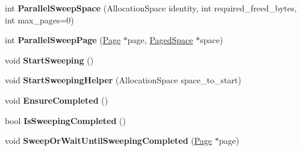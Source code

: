 \begin{DoxyCompactItemize}
\item 
int {\bfseries Parallel\+Sweep\+Space} (Allocation\+Space identity, int required\+\_\+freed\+\_\+bytes, int max\+\_\+pages=0)\hypertarget{classv8_1_1internal_1_1_mark_compact_collector_1_1_sweeper_abfb8bd676f662b93aef637f27d3d20a8}{}\label{classv8_1_1internal_1_1_mark_compact_collector_1_1_sweeper_abfb8bd676f662b93aef637f27d3d20a8}

\item 
int {\bfseries Parallel\+Sweep\+Page} (\hyperlink{classv8_1_1internal_1_1_page}{Page} $\ast$page, \hyperlink{classv8_1_1internal_1_1_paged_space}{Paged\+Space} $\ast$space)\hypertarget{classv8_1_1internal_1_1_mark_compact_collector_1_1_sweeper_a6d1d797e55de73869c883dd8752513b7}{}\label{classv8_1_1internal_1_1_mark_compact_collector_1_1_sweeper_a6d1d797e55de73869c883dd8752513b7}

\item 
void {\bfseries Start\+Sweeping} ()\hypertarget{classv8_1_1internal_1_1_mark_compact_collector_1_1_sweeper_aa38ded94f135c84e06788672c48d97a3}{}\label{classv8_1_1internal_1_1_mark_compact_collector_1_1_sweeper_aa38ded94f135c84e06788672c48d97a3}

\item 
void {\bfseries Start\+Sweeping\+Helper} (Allocation\+Space space\+\_\+to\+\_\+start)\hypertarget{classv8_1_1internal_1_1_mark_compact_collector_1_1_sweeper_a11fd070f65d9aba1140218e42bf72986}{}\label{classv8_1_1internal_1_1_mark_compact_collector_1_1_sweeper_a11fd070f65d9aba1140218e42bf72986}

\item 
void {\bfseries Ensure\+Completed} ()\hypertarget{classv8_1_1internal_1_1_mark_compact_collector_1_1_sweeper_ab2c9b899974d99f4de8d2504ba4dc934}{}\label{classv8_1_1internal_1_1_mark_compact_collector_1_1_sweeper_ab2c9b899974d99f4de8d2504ba4dc934}

\item 
bool {\bfseries Is\+Sweeping\+Completed} ()\hypertarget{classv8_1_1internal_1_1_mark_compact_collector_1_1_sweeper_a85f5ef291770a4f0174c00572ca26d0f}{}\label{classv8_1_1internal_1_1_mark_compact_collector_1_1_sweeper_a85f5ef291770a4f0174c00572ca26d0f}

\item 
void {\bfseries Sweep\+Or\+Wait\+Until\+Sweeping\+Completed} (\hyperlink{classv8_1_1internal_1_1_page}{Page} $\ast$page)\hypertarget{classv8_1_1internal_1_1_mark_compact_collector_1_1_sweeper_a4fdb36c58eff1009e50ee46fd01b3b34}{}\label{classv8_1_1internal_1_1_mark_compact_collector_1_1_sweeper_a4fdb36c58eff1009e50ee46fd01b3b34}


\end{DoxyCompactItemize}

